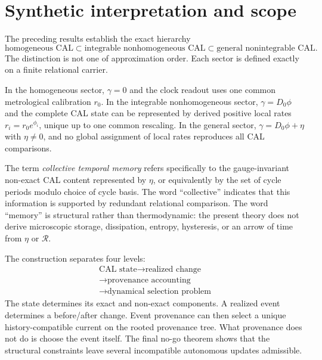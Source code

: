 \documentclass[aip,jmp,amsmath,amssymb,reprint]{revtex4-2}
\newcommand{\Rcal}{\mathcal{R}}
\begin{document}
\section{Synthetic interpretation and scope}\label{sec:discussion}

The preceding results establish the exact hierarchy
\begin{equation}
\boxed{
\text{homogeneous CAL}
\subset
\text{integrable nonhomogeneous CAL}
\subset
\text{general nonintegrable CAL}.
}
\label{eq:temporal-hierarchy}
\end{equation}
The distinction is not one of approximation order. Each sector is defined exactly on a finite relational carrier.

In the homogeneous sector, $\gamma=0$ and the clock readout uses one common metrological calibration $r_0$. In the integrable nonhomogeneous sector, $\gamma=D_0\phi$ and the complete CAL state can be represented by derived positive local rates $r_i=r_0e^{\phi_i}$, unique up to one common rescaling. In the general sector, $\gamma=D_0\phi+\eta$ with $\eta\neq0$, and no global assignment of local rates reproduces all CAL comparisons.

The term \emph{collective temporal memory} refers specifically to the gauge-invariant non-exact CAL content represented by $\eta$, or equivalently by the set of cycle periods modulo choice of cycle basis. The word ``collective'' indicates that this information is supported by redundant relational comparison. The word ``memory'' is structural rather than thermodynamic: the present theory does not derive microscopic storage, dissipation, entropy, hysteresis, or an arrow of time from $\eta$ or $\Rcal$.

The construction separates four levels:
\begin{equation}
\boxed{
\begin{gathered}
\text{CAL state}\longrightarrow\text{realized change}\\
\longrightarrow\text{provenance accounting}\\
\longrightarrow\text{dynamical selection problem}
\end{gathered}
}
\label{eq:four-levels}
\end{equation}
The state determines its exact and non-exact components. A realized event determines a before/after change. Event provenance can then select a unique history-compatible current on the rooted provenance tree. What provenance does not do is choose the event itself. The final no-go theorem shows that the structural constraints leave several incompatible autonomous updates admissible.
\end{document}
